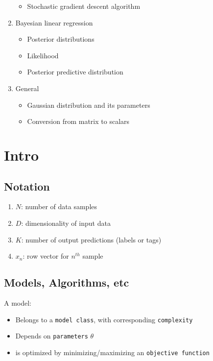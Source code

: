\documentclass[12pt,a4paper]{article}
\begin{document}
\begin{enumerate}
\begin{itemize}
				\item Stochastic gradient descent algorithm
			\end{itemize}
		\item Bayesian linear regression
			\begin{itemize}
				\item Posterior distributions
				\item Likelihood 
				\item Posterior predictive distribution
			\end{itemize}
		\item General
			\begin{itemize}
				\item Gaussian distribution and its parameters
				\item Conversion from matrix to scalars
			\end{itemize}
	\end{enumerate}

\newpage

\section{Intro}
	
\subsection{Notation}
	\begin{enumerate}
		\item $N$: number of data samples
		\item $D$: dimensionality of input data
		\item $K$: number of output predictions (labels or tags)
		\item $x_n$: row vector for $n^{th}$ sample
	\end{enumerate}
	
\subsection{Models, Algorithms, etc}
	A model:
	\begin{itemize}
		\item Belongs to a \texttt{model class}, with corresponding \texttt{complexity}
		\item Depends on \texttt{parameters} $\theta$
		\item is optimized by minimizing/maximizing an \texttt{objective function}
		
	\end{itemize} 


	
\end{document}
